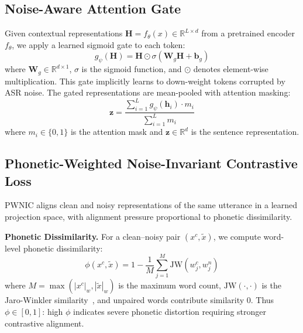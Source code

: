 \documentclass[conference]{IEEEtran}
\begin{document}
\subsection{Noise-Aware Attention Gate}

Given contextual representations $\mathbf{H} = f_\theta(x) \in \mathbb{R}^{L \times d}$ from a pretrained encoder $f_\theta$, we apply a learned sigmoid gate to each token:
\begin{equation}
    g_\psi(\mathbf{H}) = \mathbf{H} \odot \sigma(\mathbf{W}_g \mathbf{H} + \mathbf{b}_g)
    \label{eq:gate}
\end{equation}
where $\mathbf{W}_g \in \mathbb{R}^{d \times 1}$, $\sigma$ is the sigmoid function, and $\odot$ denotes element-wise multiplication. This gate implicitly learns to down-weight tokens corrupted by ASR noise. The gated representations are mean-pooled with attention masking:
\begin{equation}
    \mathbf{z} = \frac{\sum_{i=1}^{L} g_\psi(\mathbf{h}_i) \cdot m_i}{\sum_{i=1}^{L} m_i}
    \label{eq:pool}
\end{equation}
where $m_i \in \{0, 1\}$ is the attention mask and $\mathbf{z} \in \mathbb{R}^d$ is the sentence representation.

\subsection{Phonetic-Weighted Noise-Invariant Contrastive Loss}
\label{sec:pwnic}

PWNIC aligns clean and noisy representations of the same utterance in a learned projection space, with alignment pressure proportional to phonetic dissimilarity.

\textbf{Phonetic Dissimilarity.} For a clean--noisy pair $(x^c, \tilde{x})$, we compute word-level phonetic dissimilarity:
\begin{equation}
    \phi(x^c, \tilde{x}) = 1 - \frac{1}{M} \sum_{j=1}^{M} \text{JW}(w_j^c, w_j^n)
    \label{eq:phi}
\end{equation}
where $M = \max(|x^c|_w, |\tilde{x}|_w)$ is the maximum word count, $\text{JW}(\cdot, \cdot)$ is the Jaro-Winkler similarity~\cite{winkler1990string}, and unpaired words contribute similarity 0. Thus $\phi \in [0, 1]$: high $\phi$ indicates severe phonetic distortion requiring stronger contrastive alignment.
\end{document}
